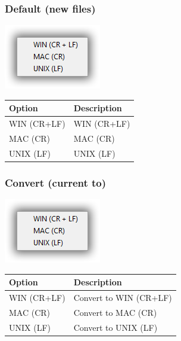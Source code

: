\newpage
\hypertarget{menu_format_eol_default}{}
\subsubsection{Default (new files) }

\includegraphics[scale=0.50]{./res/eol.png}\\

\begin{scriptsize}\begin{tabularx}{\textwidth}{>{\hsize=0.3\hsize}X>{\hsize=0.7\hsize}X}\\
    \hline
    \textbf{Option} & \textbf{Description} \\
    \hline
    WIN (CR+LF) & WIN (CR+LF) \\
    MAC (CR) & MAC (CR) \\
    UNIX (LF) & UNIX (LF) \\
    \hline
  \end{tabularx}\end{scriptsize}


\hypertarget{menu_format_eol_convert}{}
\subsubsection{Convert (current to)}

\includegraphics[scale=0.50]{./res/eol.png}\\

\begin{scriptsize}\begin{tabularx}{\textwidth}{>{\hsize=0.3\hsize}X>{\hsize=0.7\hsize}X}\\
    \hline
    \textbf{Option} & \textbf{Description} \\
    \hline
    WIN (CR+LF) & Convert to WIN (CR+LF) \\
    MAC (CR) & Convert to MAC (CR) \\
    UNIX (LF) & Convert to UNIX (LF) \\
    \hline
  \end{tabularx}\end{scriptsize}


